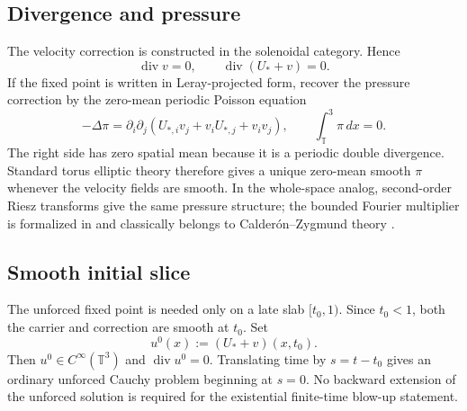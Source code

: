 \documentclass[11pt]{article}
\numberwithin{equation}{section}
\newcommand{\T}{\mathbb T^3}
\newcommand{\diver}{\operatorname{div}}
\begin{document}
\subsection{Divergence and pressure}
The velocity correction is constructed in the solenoidal category.  Hence
\begin{equation}
\diver v=0,
\qquad
\diver(U_*+v)=0.
\label{eq:divcorr}
\end{equation}
If the fixed point is written in Leray-projected form, recover the pressure correction by the zero-mean periodic Poisson equation
\begin{equation}
-\Delta\pi
=\partial_i\partial_j
\left(U_{*,i}v_j+v_iU_{*,j}+v_iv_j\right),
\qquad
\int_\T\pi\,dx=0.
\label{eq:pressure}
\end{equation}
The right side has zero spatial mean because it is a periodic double divergence.  Standard torus elliptic theory therefore gives a unique zero-mean smooth \(\pi\) whenever the velocity fields are smooth.  In the whole-space analog, second-order Riesz transforms give the same pressure structure; the bounded Fourier multiplier is formalized in  and classically belongs to Calder\'on--Zygmund theory \cite{Stein1970,OpenAIRepo2026}.

\subsection{Smooth initial slice}
The unforced fixed point is needed only on a late slab \([t_0,1)\).  Since \(t_0<1\), both the carrier and correction are smooth at \(t_0\).  Set
\begin{equation}
u^0(x):=(U_*+v)(x,t_0).
\label{eq:datum}
\end{equation}
Then \(u^0\in C^\infty(\T)\) and \(\diver u^0=0\).  Translating time by \(s=t-t_0\) gives an ordinary unforced Cauchy problem beginning at \(s=0\).  No backward extension of the unforced solution is required for the existential finite-time blow-up statement.
\end{document}
